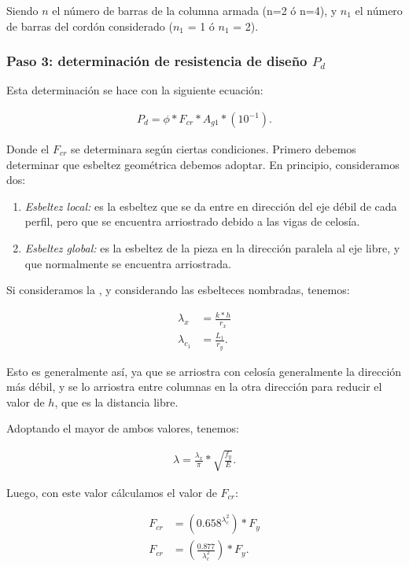 \documentclass[../main.tex]{subfiles}
\begin{document}
Siendo $n$ el número de barras de la columna armada (n=2 ó n=4), y $n_1$ el
número de barras del cordón considerado ($n_1$ = 1 ó $n_1$ = 2).

\subsubsection{Paso 3: determinación de resistencia de diseño $P_d$}

Esta determinación se hace con la siguiente ecuación:

\begin{align*}
  P_d = \phi * F_{cr} * A_{g1} * (10^{-1}) 
.\end{align*}

Donde el $F_{cr}$ se determinara según ciertas condiciones. Primero debemos
determinar que esbeltez geométrica debemos adoptar. En principio, consideramos
dos:

\begin{enumerate}
  \item \textit{Esbeltez local:} es la esbeltez que se da entre en dirección del
    eje débil de cada perfil, pero que se encuentra arriostrado debido a las 
    vigas de celosía. 
  \item \textit{Esbeltez global:} es la esbeltez de la pieza en la dirección
    paralela al eje libre, y que normalmente se encuentra arriostrada.
\end{enumerate}

Si consideramos la , y considerando las esbelteces nombradas,
tenemos:

\begin{align*}
  \lambda_{x} &= \frac{k*h}{r_x} \tag{General} \\[5pt]
  \lambda_{c_1} &= \frac{L_1}{r_y} \tag{Local}
.\end{align*}

Esto es generalmente así, ya que se arriostra con celosía generalmente la
dirección más débil, y se lo arriostra entre columnas en la otra dirección para
reducir el valor de $h$, que es la distancia libre.

Adoptando el mayor de ambos valores, tenemos:

\begin{align*}
  \lambda = \frac{\lambda_x}{\pi} * \sqrt{\frac{f_y}{E}}   
.\end{align*}

Luego, con este valor cálculamos el valor de $F_{cr}$:

\begin{align*}
  F_{cr} &= \left( 0.658^{\lambda_c^2} \right)*F_y \tag{$\lambda_c \leq 1.5$}  \\[5pt]
  F_{cr} &= \left( \frac{0.877}{\lambda_c^2} \right) * F_y \tag{$\lambda_c \geq 1.5$}
.\end{align*}
\end{document}
